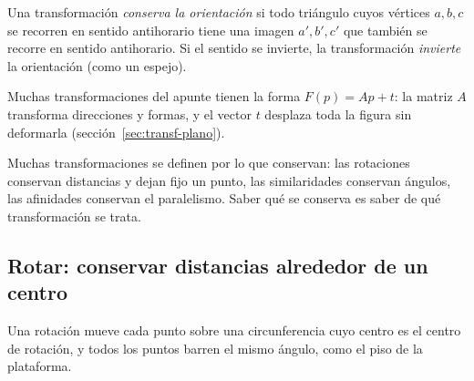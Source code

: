 \begin{center}
\end{center}

\begin{definicion}[Orientación]
Una transformación \emph{conserva la orientación} si todo triángulo cuyos vértices
\(a,b,c\) se recorren en sentido antihorario tiene una imagen \(a',b',c'\) que también se
recorre en sentido antihorario. Si el sentido se invierte, la transformación \emph{invierte}
la orientación (como un espejo).
\end{definicion}

Muchas transformaciones del apunte tienen la forma \(F(p)=Ap+t\): la matriz \(A\) transforma
direcciones y formas, y el vector \(t\) desplaza toda la figura sin deformarla
(sección~\ref{sec:transf-plano}).

\begin{idea}
Muchas transformaciones se definen por lo que conservan: las rotaciones conservan distancias y
dejan fijo un punto, las similaridades conservan ángulos, las afinidades conservan el
paralelismo. Saber qué se conserva es saber de qué transformación se trata.
\end{idea}

\subsection{Rotar: conservar distancias alrededor de un centro}\label{sec:rotar}


Una rotación mueve cada punto sobre una circunferencia cuyo centro es el centro de rotación,
y todos los puntos barren el mismo ángulo, como el piso de la plataforma.

